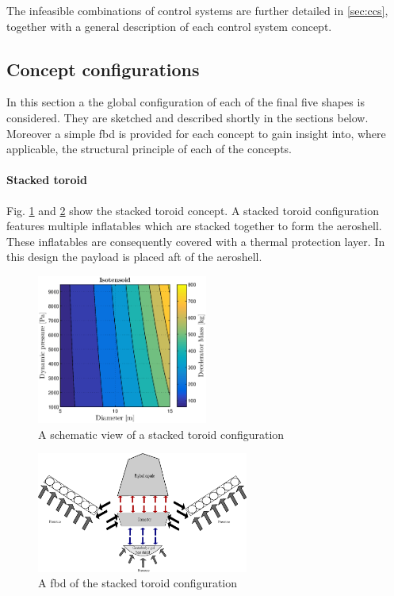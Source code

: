 The infeasible combinations of control systems are further detailed in \ref{sec:ccs}, together with a general description of each control system concept. 

\subsection{Concept configurations} \label{sec:conf}
In this section a the global configuration of each of the final five shapes is considered. They are sketched and described shortly in the sections below. Moreover a simple \gls{fbd} is provided for each concept to gain insight into, where applicable, the structural principle of each of the concepts.

\paragraph{Stacked toroid}

Fig. \ref{fig:conc_stacked} and \ref{fig:fbd_stacked} show the stacked toroid concept. A stacked toroid configuration features multiple inflatables which are stacked together to form the aeroshell. These inflatables are consequently covered with a thermal protection layer. In this design the payload is placed aft of the aeroshell.\

\begin{figure}[H]
\centering
\includegraphics[width = 0.5\textwidth]{Figure/ISO_comp.eps}
\caption{A schematic view of a stacked toroid configuration}
\label{fig:conc_stacked}
\end{figure}

\begin{figure}[H]
\centering
\includegraphics[width = 0.62\textwidth]{Figure/FBD_stacked.eps}
\caption{A \gls{fbd} of the stacked toroid configuration}
\label{fig:fbd_stacked}
\end{figure}


